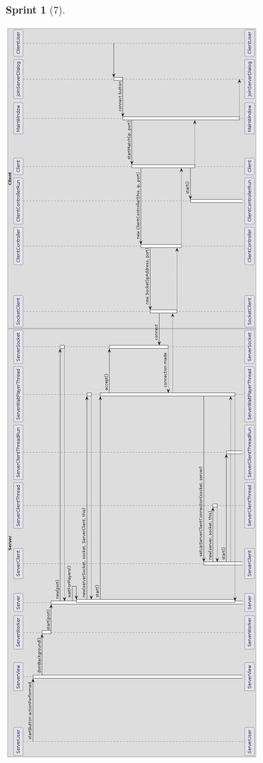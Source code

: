 \documentclass[12pt,a4paper,openright]{book}
\theoremstyle{break}
\newtheorem*{sprint}{Sprint}
\begin{document}
\begin{sprint}[7]
\begin{center}
\includegraphics[scale=0.3]{umlconexionessprint7.png}
\end{center}


\end{sprint}
\end{document}
